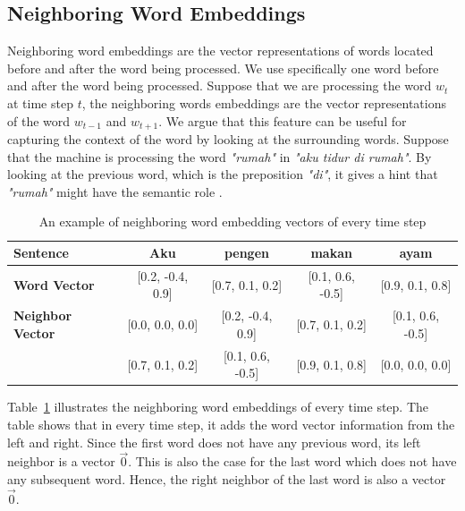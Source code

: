 \subsection{Neighboring Word Embeddings}
Neighboring word embeddings are the vector representations of words located before and after the word being processed. We use specifically one word before and after the word being processed. Suppose that we are processing the word $w_{t}$ at time step $t$, the neighboring words embeddings are the vector representations of the word $w_{t-1}$ and $w_{t+1}$. We argue that this feature can be useful for capturing the context of the word by looking at the surrounding words. Suppose that the machine is processing the word \textit{"rumah"} in \textit{"aku tidur di rumah"}. By looking at the previous word, which is the preposition \textit{"di"}, it gives a hint that \textit{"rumah"} might have the semantic role \location.

\begin{table}
	\centering
	\caption{An example of neighboring word embedding vectors of every time step}
	\label{tab:examplenwe}
	\begin{tabular}{|lcccc|}
		\hline
		\textbf{Sentence} 				& Aku & pengen & makan & ayam \\
		\hline
		\textbf{Word Vector}		& [0.2, -0.4, 0.9] & [0.7, 0.1, 0.2] & [0.1, 0.6, -0.5] & [0.9, 0.1, 0.8] \\			\textbf{Neighbor Vector}	& [0.0, 0.0, 0.0] & [0.2, -0.4, 0.9] & [0.7, 0.1, 0.2] & [0.1, 0.6, -0.5] \\
													& [0.7, 0.1, 0.2] & [0.1, 0.6, -0.5] &  [0.9, 0.1, 0.8] &  [0.0, 0.0, 0.0] \\
		\hline
	\end{tabular}
\end{table}

Table~\ref{tab:examplenwe} illustrates the neighboring word embeddings of every time step. The table shows that in every time step, it adds the word vector information from the left and right. Since the first word does not have any previous word, its left neighbor is a vector $\vec{0}$. This is also the case for the last word which does not have any subsequent word. Hence, the right neighbor of the last word is also a vector  $\vec{0}$.

